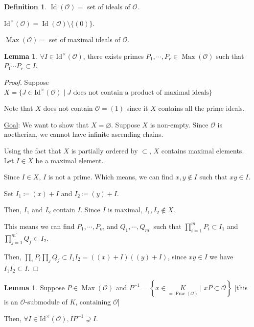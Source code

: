 \documentclass[openany]{amsbook}
\numberwithin{section}{chapter}
\theoremstyle{definition}
\newtheorem*{definition}{Definition}
\newtheorem{lemma}[theorem]{Lemma}
\newcommand{\Frac}{\operatorname{Frac}}
\begin{document}
\begin{definition}
    \(\operatorname{Id}(\mathcal{O}) =\) set of ideals of \(\mathcal{O}\).

    \(\operatorname{Id^\times}(\mathcal{O}) = \operatorname{Id}(\mathcal{O} ) \setminus \{ (0) \}\).

    \(\operatorname{Max}(\mathcal{O}) =\) set of maximal ideals of \(\mathcal{O} \). 
\end{definition}

\begin{lemma}
    \(\forall I \in \operatorname{Id^\times }(\mathcal{O}) \), there exists primes \(P_1, \cdots , P_r \in \operatorname{Max}(\mathcal{O}) \) such that \(P_1 \cdots P_r \subset I\).
\end{lemma}

\begin{proof}
    Suppose \(X = \{ J \in \operatorname{Id^\times }(\mathcal{O}) \mid J \text{ does not contain a product of maximal ideals} \} \)
    
    Note that \(X\) does not contain \(\mathcal{O} = (1)\) since it \(X\) contains all the prime ideals.

    \underline{Goal}: We want to show that \(X = \varnothing\). Suppose \(X\) is non-empty. Since \(\mathcal{O}\) is noetherian, we cannot have infinite ascending chains.

    Using the fact that \(X\) is partially ordered by \(\subset\), \(X\) contains maximal elements. Let \(I \in X\) be a maximal element.

    Since \(I\in X\), \(I\) is not a prime. Which means, we can find \(x,y\notin I\) such that \(xy\in I\).
    
    Set \(I_1 \coloneqq (x)+I\) and \(I_2 \coloneqq (y)+I\).

    Then, \(I_1\) and \(I_2\) contain \(I\). Since \(I\) is maximal, \(I_1, I_2\notin X\).

    This means we can find \(P_1, \cdots , P_m\) and \(Q_1, \cdots, Q_{m^{\prime}}\) such that \(\prod_{i=1}^m P_i \subset I_1\) and \(\prod_{j=1}^{m^{\prime}} Q_j \subset I_2\).

    Then, \(\prod_i P_i \prod_j Q_j \subset I_1 I_2 = ((x)+I)((y)+I)\), since \(xy\in I\) we have \(I_1 I_2 \subset I\). 

\end{proof}

\begin{lemma}
    Suppose \(P \in \operatorname{Max}(\mathcal{O})\) and \(P ^{-1} = \left\{ x \in \underset{=\Frac(\mathcal{O})}{K} \mid xP \subset \mathcal{O} \right\} \) [this is an \(\mathcal{O}\)-submodule of \(K\), containing \(\mathcal{O}\)]
    
    Then, \(\forall I \in \operatorname{Id^\times}(\mathcal{O}), I P ^{-1} \supsetneq I\).
\end{lemma}
\end{document}
